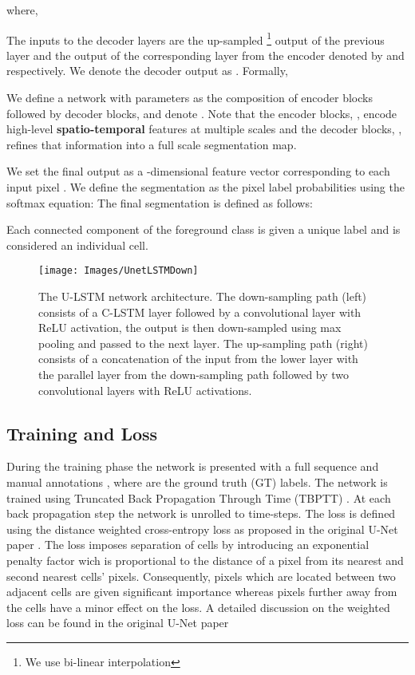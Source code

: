 \documentclass{article}
\begin{document}
where,


The inputs to the decoder layers   are the up-sampled \footnote{We use bi-linear interpolation} output of the previous layer and the output of the corresponding layer from the encoder denoted by  and   respectively. We denote the decoder output as . Formally,





We define a network   with parameters  as  the composition of  encoder blocks followed by  decoder blocks, and denote  . Note that the encoder blocks, ,  encode high-level \textbf{spatio-temporal} features at multiple scales and the decoder blocks, , refines that information into a full scale segmentation map.


We set the final output as a -dimensional feature vector corresponding to each input pixel . 
We define the segmentation as the pixel label probabilities using the softmax equation: 
The final segmentation is defined as follows:

Each connected component of the foreground class is given a unique label and is considered an individual cell. 
\begin{figure}
\noindent \begin{centering}
\texttt{[image: Images/UnetLSTMDown]}  \par\end{centering}
\protect\caption{The U-LSTM network architecture. The down-sampling path (left) consists of a C-LSTM layer followed by a convolutional layer with ReLU activation, the output is then down-sampled using max pooling and passed to the next layer. The up-sampling path (right) consists of a concatenation of the input from the lower layer with the parallel layer from the down-sampling path followed by two convolutional layers with ReLU activations.  \label{fig:Architecture}}
\end{figure}

\subsection{Training and Loss}\label{subsec:Training}

During the training phase the network is presented with a full sequence and manual annotations , where  are the ground truth (GT) labels. 
The network is trained using Truncated Back Propagation Through Time (TBPTT) \cite{williams1990efficient}. At each back propagation step the network is unrolled to  time-steps. The loss is defined using the distance weighted cross-entropy loss as proposed in the original U-Net paper \cite{Ronneberger15}. The loss imposes separation of cells by introducing an exponential penalty factor wich is  proportional to the distance of a pixel from its nearest and second nearest cells' pixels. Consequently, pixels which are located between two adjacent cells are given significant importance whereas pixels further away from the cells have a minor effect on the loss. A detailed discussion on the weighted loss can be found in the original U-Net paper \cite{Ronneberger15}
\end{document}
